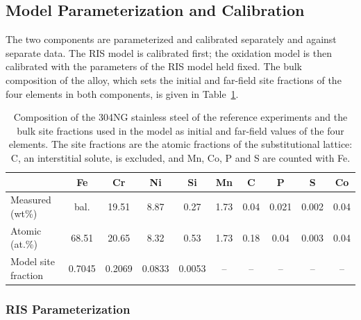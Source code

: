 \documentclass[3p,times]{elsarticle} %
\begin{document}
\subsection{Model Parameterization and Calibration}
\label{sec:methodCalibration}
The two components are parameterized and calibrated separately and against
separate data. The RIS model is calibrated first; the oxidation model is then
calibrated with the parameters of the RIS model held fixed. The bulk composition
of the alloy, which sets the initial and far-field site fractions of the four
elements in both components, is given in Table~\ref{tab:composition}.

\begin{table}[htbp]
\centering
\caption{Composition of the 304NG stainless steel of the reference experiments
\cite{deng2017effect} and the bulk site fractions used in the model as
initial and far-field values of the four elements. The site fractions are the
atomic fractions of the substitutional lattice: C, an interstitial solute, is
excluded, and Mn, Co, P and S are counted with Fe.}
\label{tab:composition}
\footnotesize
\setlength{\tabcolsep}{4pt}
\begin{tabular}{@{}lccccccccc@{}}
\hline
 & Fe & Cr & Ni & Si & Mn & C & P & S & Co \\
\hline
Measured (wt\%) & bal. & 19.51 & 8.87 & 0.27 & 1.73 & 0.04 & 0.021 & 0.002 & 0.04 \\
Atomic (at.\%) & 68.51 & 20.65 & 8.32 & 0.53 & 1.73 & 0.18 & 0.04 & 0.003 & 0.04 \\
Model site fraction & 0.7045 & 0.2069 & 0.0833 & 0.0053 & -- & -- & -- & -- & -- \\
\hline
\end{tabular}
\end{table}


\subsubsection{RIS Parameterization}
\label{sec:methodRISCalibration}
\end{document}
